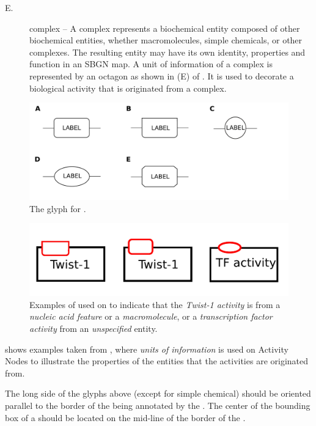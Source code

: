 \begin{glyphDescription}
\begin{description}
\item[E.] complex -- A complex represents a biochemical entity composed of other biochemical entities, whether macromolecules, simple chemicals, or other complexes. The resulting entity may 
have its own identity, properties and function in an SBGN map. A unit of information of a complex is represented by an octagon as shown in (E) of .  It is used to decorate a biological activity that is originated from a complex.
\end{description}

\begin{figure}[H]
  \centering
  \includegraphics[scale = 0.2]{images/unitInformation_ba}
  \caption{The \AF glyph for .}
  \label{fig:af:unitInfo}
\end{figure}

\begin{figure}[H]
  \centering
  \includegraphics[scale = 0.5]{examples/unitofinformation}
  \caption{Examples of  used on  to indicate that the \emph{Twist-1 activity} is from a \emph{nucleic acid feature} or a \emph{macromolecule}, or a \emph{transcription factor activity} from an \emph{unspecified} entity.}
  \label{fig:af:unitofinfo}
\end{figure}

 shows examples taken from , where \emph{units of information} is used on Activity Nodes to illustrate the properties of the entities that the activities are originated from.

The long side of the glyphs above (except for simple chemical) should be oriented parallel to the border of the  being annotated by the . The center of the bounding box of a  should be located on the mid-line of the border of the .


\end{glyphDescription}
